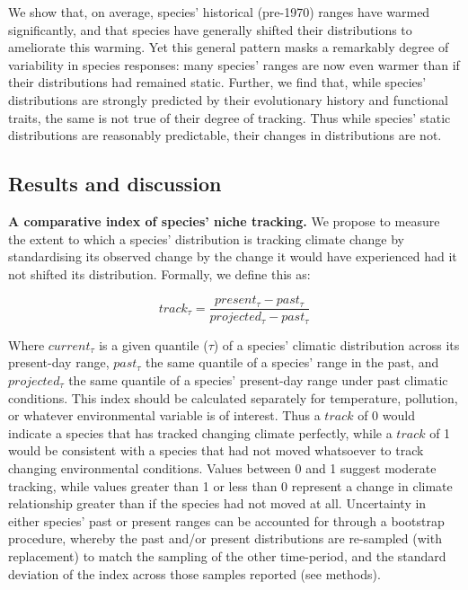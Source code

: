 \documentclass[12pt]{report}
\begin{document}
We show that, on average, species' historical (pre-1970) ranges have
warmed significantly, and that species have generally shifted their
distributions to ameliorate this warming. Yet this general pattern
masks a remarkably degree of variability in species responses: many
species' ranges are now even warmer than if their distributions had
remained static. Further, we find that, while species' distributions
are strongly predicted by their evolutionary history and functional
traits, the same is not true of their degree of tracking. Thus while
species' static distributions are reasonably predictable, their
changes in distributions are not.

\clearpage
\subsection*{Results and discussion}
\textbf{A comparative index of species' niche tracking.} We propose to
measure the extent to which a species' distribution is tracking
climate change by standardising its observed change by the change it
would have experienced had it not shifted its distribution. Formally,
we define this as:

\begin{equation}
  track_\tau = \frac{present_\tau - past_\tau}{projected_\tau - past_\tau}
\end{equation}

Where $current_\tau$ is a given quantile ($\tau$) of a species'
climatic distribution across its present-day range, $past_\tau$ the
same quantile of a species' range in the past, and $projected_\tau$
the same quantile of a species' present-day range under past climatic
conditions. This index should be calculated separately for
temperature, pollution, or whatever environmental variable is of
interest. Thus a $track$ of 0 would indicate a species that has
tracked changing climate perfectly, while a $track$ of 1 would be
consistent with a species that had not moved whatsoever to track
changing environmental conditions. Values between 0 and 1 suggest
moderate tracking, while values greater than 1 or less than 0
represent a change in climate relationship greater than if the species
had not moved at all. Uncertainty in either species' past or present
ranges can be accounted for through a bootstrap procedure, whereby the
past and/or present distributions are re-sampled (with replacement) to
match the sampling of the other time-period, and the standard
deviation of the index across those samples reported (see methods).
\end{document}
